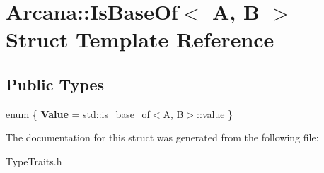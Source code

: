 \hypertarget{struct_arcana_1_1_is_base_of}{}\section{Arcana\+:\+:Is\+Base\+Of$<$ A, B $>$ Struct Template Reference}
\label{struct_arcana_1_1_is_base_of}
\subsection*{Public Types}
\begin{DoxyCompactItemize}
\item 
\mbox{\label{struct_arcana_1_1_is_base_of_a5c686e226da2d0fda99277d9f61121a1}} 
enum \{ {\bfseries Value} = std\+:\+:is\+\_\+base\+\_\+of$<$A, B$>$\+:\+:value
 \}
\end{DoxyCompactItemize}


The documentation for this struct was generated from the following file\+:\begin{DoxyCompactItemize}
\item 
Type\+Traits.\+h\end{DoxyCompactItemize}
